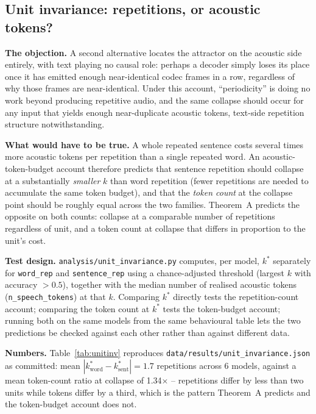 \documentclass[11pt]{article}
\begin{document}
\subsection{Unit invariance: repetitions, or acoustic tokens?}
\label{sec:s8-unit}

\textbf{The objection.} A second alternative locates the attractor on the
acoustic side entirely, with text playing no causal role: perhaps a decoder
simply loses its place once it has emitted enough near-identical codec frames
in a row, regardless of why those frames are near-identical. Under this
account, ``periodicity'' is doing no work beyond producing repetitive audio,
and the same collapse should occur for any input that yields enough
near-duplicate acoustic tokens, text-side repetition structure notwithstanding.

\textbf{What would have to be true.} A whole repeated sentence costs several
times more acoustic tokens per repetition than a single repeated word. An
acoustic-token-budget account therefore predicts that sentence repetition
should collapse at a substantially \emph{smaller} $k$ than word repetition
(fewer repetitions are needed to accumulate the same token budget), and that
the \emph{token count} at the collapse point should be roughly equal across
the two families. Theorem~A predicts the opposite on both counts: collapse at
a comparable number of repetitions regardless of unit, and a token count at
collapse that differs in proportion to the unit's cost.

\textbf{Test design.} \texttt{analysis/unit\_invariance.py} computes, per
model, $k^\ast$ separately for \texttt{word\_rep} and \texttt{sentence\_rep}
using a chance-adjusted threshold (largest
$k$ with accuracy $>0.5$), together with the median number of realised
acoustic tokens (\texttt{n\_speech\_tokens}) at that $k$. Comparing $k^\ast$
directly tests the repetition-count account; comparing the token count at
$k^\ast$ tests the token-budget account; running both on the same models from
the same behavioural table lets the two predictions be checked against each
other rather than against different data.

\textbf{Numbers.} Table~\ref{tab:unitinv} reproduces
\texttt{data/results/unit\_invariance.json} as committed: mean
$|k^\ast_{\mathrm{word}} - k^\ast_{\mathrm{sent}}| = 1.7$ repetitions
across 6 models, against a mean token-count ratio at collapse of
1.34$\times$ -- repetitions differ by less than two units while
tokens differ by a third, which is the pattern Theorem~A predicts and the
token-budget account does not.
\end{document}
